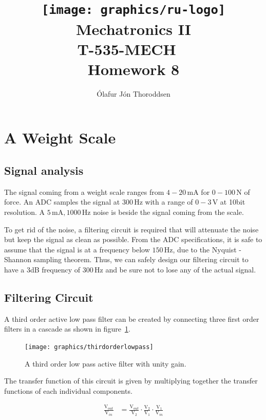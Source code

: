 \documentclass[11pt,a4paper,titlepage]{article}
\author{Ólafur Jón Thoroddsen}  %
\title{\texttt{[image: graphics/ru-logo]}\\\vspace{10mm}
	Mechatronics II\\T-535-MECH \ \\Homework 8}  %
\newcommand{\mA}{\,\textrm{mA}}
\newcommand{\N}{\,\textrm{N}}
\newcommand{\Hz}{\,\textrm{Hz}}
\newcommand{\V}{\,\textrm{V}}
\begin{document}
	\maketitle
	
	\tableofcontents
	\pagebreak
	
	\section{A Weight Scale\label{sec:scale}}
	\subsection{Signal analysis}
	The signal coming from a weight scale ranges from $4-20\mA$ for $0-100\N$ of force. An ADC samples the signal at $300\Hz$ with a range of $0-3\V$ at 10bit resolution. A $5\mA, 1000\Hz$ noise is beside the signal coming from the scale. 
	
	To get rid of the noise, a filtering circuit is required that will attenuate the noise but keep the signal as clean as possible. From the ADC specifications, it is safe to assume that the signal is at a frequency below $150\Hz$, due to the Nyquist - Shannon sampling theorem. Thus, we can safely design our filtering circuit to have a 3dB frequency of $300\Hz$ and be sure not to lose any of the actual signal.
	
	
	\subsection{Filtering Circuit}
	A third order active low pass filter can be created by connecting three first order filters in a cascade as shown in figure~\ref{fig:cascadefilters}.
	
	\begin{figure}[h]
		\centering
		\texttt{[image: graphics/thirdorderlowpass]}
		\caption{A third order low pass active filter with unity gain.}
		\label{fig:cascadefilters}
	\end{figure}
	
	\noindent The transfer function of this circuit is given by multiplying together the transfer functions of each individual components.
	
	\begin{equation}
	\begin{aligned}
		\frac{\text{V}_{out}}{\text{V}_{in}} &= \frac{\text{V}_{out}}{\text{V}_2} \cdot \frac{\text{V}_2}{\text{V}_1} \cdot \frac{\text{V}_{1}}{\text{V}_{in}}\\
	\end{aligned}
	\end{equation}
\end{document}
